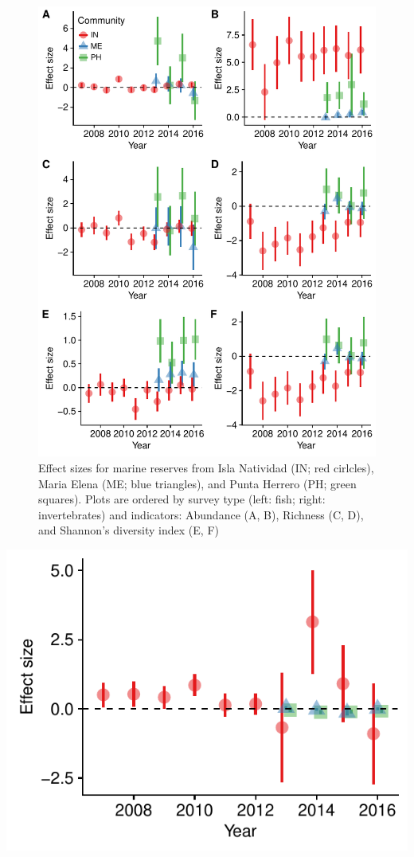 \documentclass{frontiersSCNS}
\begin{document}
\begin{figure}
\centering
\includegraphics{Villasenor-Derbez_files/figure-latex/unnamed-chunk-3-1.pdf}
\caption{\label{fig:unnamed-chunk-3}\label{fig:indicators}Effect sizes for
marine reserves from Isla Natividad (IN; red cirlcles), Maria Elena (ME;
blue triangles), and Punta Herrero (PH; green squares). Plots are
ordered by survey type (left: fish; right: invertebrates) and
indicators: Abundance (A, B), Richness (C, D), and Shannon's diversity
index (E, F)}
\end{figure}

\includegraphics{Villasenor-Derbez_files/figure-latex/unnamed-chunk-4-1.pdf}
\end{document}
